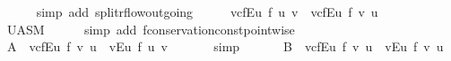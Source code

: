 \begin{isabellebody}
\ \ \ \ \isamarkupfalse%
\ {\isacharparenleft}simp\ add{\isacharcolon}\ split{\isacharunderscore}rflow{\isacharunderscore}outgoing{\isacharparenright}\isanewline
\ \ \isamarkupfalse%
\ \isamarkupfalse%
\ {\isachardoublequoteopen}{\isacharparenleft}{\isasymSum}v{\isasymin}cf{\isachardot}E{\isacharbackquote}{\isacharbackquote}{\isacharbraceleft}u{\isacharbraceright}{\isachardot}\ f{\isacharprime}\ {\isacharparenleft}u{\isacharcomma}\ v{\isacharparenright}{\isacharparenright}\ {\isacharequal}\ {\isacharparenleft}{\isasymSum}v{\isasymin}cf{\isachardot}E{\isasyminverse}{\isacharbackquote}{\isacharbackquote}{\isacharbraceleft}u{\isacharbraceright}{\isachardot}\ f{\isacharprime}\ {\isacharparenleft}v{\isacharcomma}\ u{\isacharparenright}{\isacharparenright}{\isachardoublequoteclose}\ \ \isanewline
\ \ \ \ \isamarkupfalse%
\ U{\isacharunderscore}ASM\isanewline
\ \ \ \ \isamarkupfalse%
\ {\isacharparenleft}simp\ add{\isacharcolon}\ f{\isacharprime}{\isachardot}conservation{\isacharunderscore}const{\isacharunderscore}pointwise{\isacharparenright}\isanewline
\ \ \isamarkupfalse%
\ \isamarkupfalse%
\ {\isachardoublequoteopen}{\isacharquery}A\ {\isacharequal}\ {\isacharparenleft}{\isasymSum}v{\isasymin}cf{\isachardot}E{\isasyminverse}{\isacharbackquote}{\isacharbackquote}{\isacharbraceleft}u{\isacharbraceright}{\isachardot}\ f{\isacharprime}\ {\isacharparenleft}v{\isacharcomma}\ u{\isacharparenright}{\isacharparenright}\ {\isacharminus}\ {\isacharparenleft}{\isasymSum}v{\isasymin}E{\isasyminverse}{\isacharbackquote}{\isacharbackquote}{\isacharbraceleft}u{\isacharbraceright}{\isachardot}\ f{\isacharprime}\ {\isacharparenleft}u{\isacharcomma}\ v{\isacharparenright}{\isacharparenright}{\isachardoublequoteclose}\ \isanewline
\ \ \ \ \isamarkupfalse%
\ simp\isanewline
\ \ \isamarkupfalse%
\isanewline
\ \ \isamarkupfalse%
\ {\isachardoublequoteopen}{\isacharquery}B\ {\isacharequal}\ {\isacharparenleft}{\isasymSum}v{\isasymin}cf{\isachardot}E{\isasyminverse}{\isacharbackquote}{\isacharbackquote}{\isacharbraceleft}u{\isacharbraceright}{\isachardot}\ f{\isacharprime}\ {\isacharparenleft}v{\isacharcomma}\ u{\isacharparenright}{\isacharparenright}\ {\isacharminus}\ {\isacharparenleft}{\isasymSum}v{\isasymin}E{\isasyminverse}{\isacharbackquote}{\isacharbackquote}{\isacharbraceleft}u{\isacharbraceright}{\isachardot}\ f{\isacharprime}\ {\isacharparenleft}v{\isacharcomma}\ u{\isacharparenright}{\isacharparenright}{\isachardoublequoteclose}\isanewline

\end{isabellebody}
